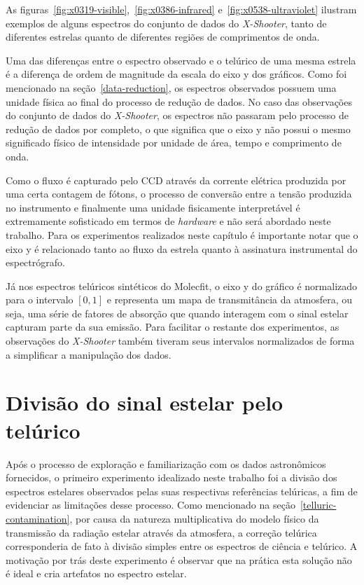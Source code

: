 As figuras~\ref{fig:x0319-visible},~\ref{fig:x0386-infrared} e~\ref{fig:x0538-ultraviolet} ilustram exemplos de alguns espectros do conjunto de dados do \textit{X-Shooter}, tanto de diferentes estrelas quanto de diferentes regiões de comprimentos de onda. 

Uma das diferenças entre o espectro observado e o telúrico de uma mesma estrela é a diferença de ordem de magnitude da escala do eixo y dos gráficos. Como foi mencionado na seção~\ref{data-reduction}, os espectros observados possuem uma unidade física ao final do processo de redução de dados. No caso das observações do conjunto de dados do \textit{X-Shooter}, os espectros não passaram pelo processo de redução de dados por completo, o que significa que o eixo y não possui o mesmo significado físico de intensidade por unidade de área, tempo e comprimento de onda. 

Como o fluxo é capturado pelo CCD através da corrente elétrica produzida por uma certa contagem de fótons, o processo de conversão entre a tensão produzida no instrumento e finalmente uma unidade fisicamente interpretável é extremamente sofisticado em termos de \textit{hardware} e não será abordado neste trabalho. Para os experimentos realizados neste capítulo é importante notar que o eixo y é relacionado tanto ao fluxo da estrela quanto à assinatura instrumental do espectrógrafo. 

Já nos espectros telúricos sintéticos do Molecfit, o eixo y do gráfico é normalizado para o intervalo $[0, 1]$ e representa um mapa de transmitância da atmosfera, ou seja, uma série de fatores de absorção que quando interagem com o sinal estelar capturam parte da sua emissão. Para facilitar o restante dos experimentos, as observações do \textit{X-Shooter} também tiveram seus intervalos normalizados de forma a simplificar a manipulação dos dados.

\section{Divisão do sinal estelar pelo telúrico}

Após o processo de exploração e familiarização com os dados astronômicos fornecidos, o primeiro experimento idealizado neste trabalho foi a divisão dos espectros estelares observados pelas suas respectivas referências telúricas, a fim de evidenciar as limitações desse processo.
Como mencionado na seção~\ref{telluric-contamination}, por causa da natureza multiplicativa do modelo físico da transmissão da radiação estelar através da atmosfera, a correção telúrica corresponderia de fato à divisão simples entre os espectros de ciência e telúrico. A motivação por trás deste experimento é observar que na prática esta solução não é ideal e cria artefatos no espectro estelar. 

